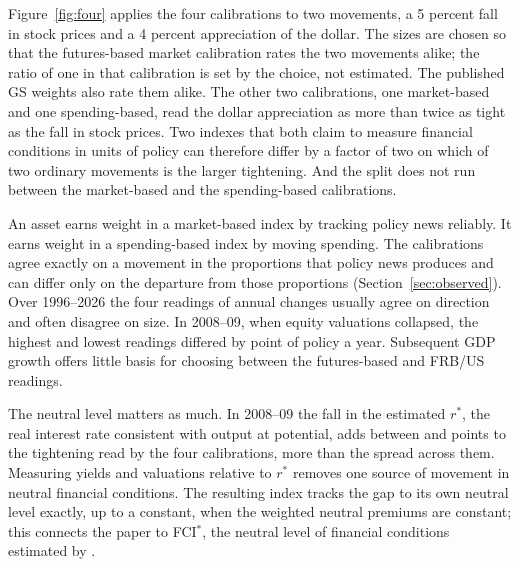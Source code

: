 \documentclass[11pt]{article}
\begin{document}
Figure~\ref{fig:four} applies the four calibrations to two movements, a 5 percent fall in stock prices and a 4 percent appreciation of the dollar. The sizes are chosen so that the futures-based market calibration rates the two movements alike; the ratio of one in that calibration is set by the choice, not estimated. The published GS weights also rate them alike. The other two calibrations, one market-based and one spending-based, read the dollar appreciation as more than twice as tight as the fall in stock prices. Two indexes that both claim to measure financial conditions in units of policy can therefore differ by a factor of two on which of two ordinary movements is the larger tightening. And the split does not run between the market-based and the spending-based calibrations.

An asset earns weight in a market-based index by tracking policy news reliably. It earns weight in a spending-based index by moving spending. The calibrations agree exactly on a movement in the proportions that policy news produces and can differ only on the departure from those proportions (Section~\ref{sec:observed}). Over 1996--2026 the four readings of annual changes usually agree on direction and often disagree on size. In 2008--09, when equity valuations collapsed, the highest and lowest readings differed by  point of policy a year. Subsequent GDP growth offers little basis for choosing between the futures-based and FRB/US readings.

The neutral level matters as much. In 2008--09 the fall in the estimated $r^*$, the real interest rate consistent with output at potential, adds between  and  points to the tightening read by the four calibrations, more than the spread across them. Measuring yields and valuations relative to $r^*$ removes one source of movement in neutral financial conditions. The resulting index tracks the gap to its own neutral level exactly, up to a constant, when the weighted neutral premiums are constant; this connects the paper to FCI$^*$, the neutral level of financial conditions estimated by \citet{caballero2026}.
\end{document}
